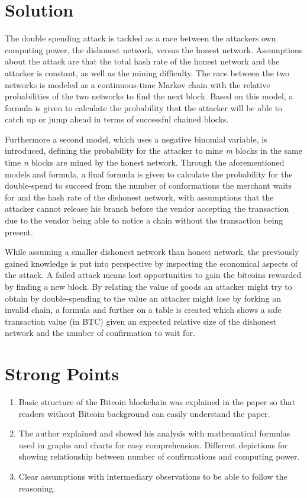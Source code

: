 \documentclass[conference]{IEEEtran}
\begin{document}
\section{Solution}

The double spending attack is tackled as a race between the attackers own computing power, the dishonest network, versus the honest network.
Assumptions about the attack are that the total hash rate of the honest network and the attacker is constant, as well as the mining difficulty.
The race between the two networks is modeled as a continuous-time Markov chain with the relative probabilities of the two networks to find the next block. Based on this model, a formula is given to calculate the probability that the attacker will be able to catch up or jump ahead in terms of successful chained blocks.

Furthermore a second model, which uses a negative binomial variable, is introduced, defining the probability for the attacker to mine \emph{m} blocks in the same time \emph{n} blocks are mined by the honest network.
Through the aforementioned models and formula, a final formula is given to calculate the probability for the double-spend to succeed from the number of conformations the merchant waits for and the hash rate of the dishonest network, with assumptions that the attacker cannot release his branch before the vendor accepting the transaction due to the vendor being able to notice a chain without the transaction being present.


While assuming a smaller dishonest network than honest network, the previously gained knowledge is put into perspective by inspecting the economical aspects of the attack.
A failed attack means lost opportunities to gain the bitcoins rewarded by finding a new block.
By relating the value of goods an attacker might try to obtain by double-spending to the value an attacker might lose by forking an invalid chain, a formula and further on a table is created which shows a safe transaction value (in BTC) given an expected relative size of the dishonest network and the number of confirmation to wait for.

\section{Strong Points}

\begin{enumerate}
 \item Basic structure of the Bitcoin blockchain was explained in the paper so that readers without Bitcoin background can easily understand the paper.
 \item The author explained and showed his analysis with mathematical formulas used in graphs and charts for easy comprehension.
 Different depictions for showing relationship between number of confirmations and computing power.
\item Clear assumptions with intermediary observations to be able to follow the reasoning.
\end{enumerate}
\end{document}

